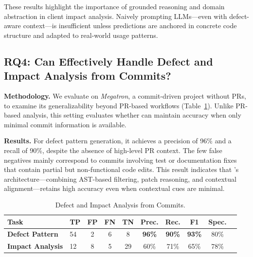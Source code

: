 These results highlight the importance of grounded reasoning and domain abstraction in client impact analysis. 
Naively prompting LLMs—even with defect-aware context—is insufficient unless predictions are anchored in concrete code structure and adapted to real-world usage patterns.


\subsection{RQ4: Can \appname Effectively Handle Defect and Impact Analysis from Commits?}
\noindent\textbf{Methodology.}
We evaluate \appname on \textit{Megatron}, a commit-driven project without PRs, to examine its generalizability beyond PR-based workflows (Table~\ref{tab:rq4-merged}).
Unlike PR-based analysis, this setting evaluates whether \appname can maintain accuracy when only minimal commit information is available.


\noindent\textbf{Results.}
For defect pattern generation, it achieves a precision of 96\% and a recall of 90\%, despite the absence of high-level PR context. 
The few false negatives mainly correspond to commits involving test or documentation fixes that contain partial but non-functional code edits. 
This result indicates that \appname’s architecture—combining AST-based filtering, patch reasoning, and contextual alignment—retains high accuracy even when contextual cues are minimal.

\begin{table}[ht]
\centering
\setlength{\tabcolsep}{3pt}
\caption{Defect and Impact Analysis from Commits.}
\label{tab:rq4-merged}
\begin{tabular}{llcccccccc}
\toprule
\textbf{Task} & \textbf{TP} & \textbf{FP} & \textbf{FN} & \textbf{TN} & \textbf{Prec.} & \textbf{Rec.} & \textbf{F1} & \textbf{Spec.} \\
\midrule
\textbf{Defect Pattern} & 54 & 2 & 6 & 8 & \textbf{96\%} & \textbf{90\%} & \textbf{93\%} & 80\% \\
\textbf{Impact Analysis} & 12 & 8 & 5 & 29 & 60\% & 71\% & 65\% & 78\% \\
\bottomrule
\end{tabular}
\vspace{-0.4cm}
\end{table}


